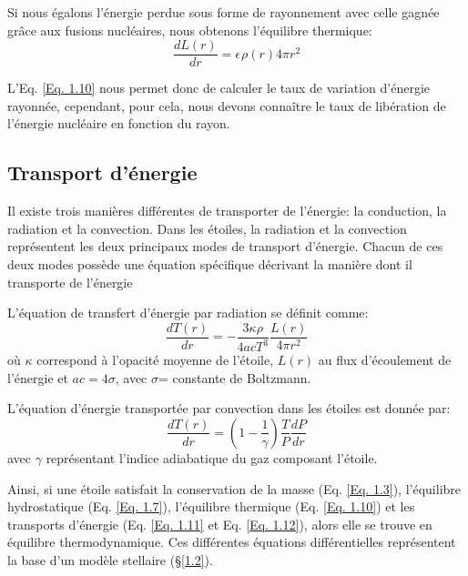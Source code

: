 Si nous égalons l'énergie perdue sous forme de rayonnement avec celle gagnée grâce aux fusions nucléaires, nous obtenons l'équilibre thermique:\begin{equation}\boxed{\dfrac{dL(r)}{dr}=\epsilon\hspace{1pt}\rho(r) 4\pi r^{2}}\label{Eq. 1.10}\end{equation}

L'Eq. \ref{Eq. 1.10} nous permet donc de calculer le taux de variation d'énergie rayonnée, cependant, pour cela, nous devons connaître le taux de libération de l'énergie nucléaire en fonction du rayon. 
\newpage

\subsection{Transport d'énergie}

Il existe trois manières différentes de transporter de l'énergie: la conduction, la radiation et la convection. Dans les étoiles, la radiation et la convection représentent les deux principaux modes de transport d'énergie. Chacun de ces deux modes possède une équation spécifique décrivant la manière dont il transporte de l'énergie\footnotemark[4]\smallskip

L'équation de transfert d'énergie par radiation se définit comme:\begin{equation}\boxed{\dfrac{dT(r)}{dr}=-\dfrac{3\kappa\rho}{4acT^{3}}\dfrac{L(r)}{4\pi r^{2}}}\label{Eq. 1.11}\end{equation} où $\kappa$ correspond à l'opacité moyenne de l'étoile, $L(r)$ au flux d'écoulement de l'énergie et $ac=4\sigma$, avec $\sigma$= constante de Boltzmann.\smallskip

L'équation d'énergie transportée par convection dans les étoiles est donnée par:\begin{equation}\boxed{\dfrac{dT(r)}{dr}= \left(1-\dfrac{1}{\gamma}\right)\dfrac{T}{P}\dfrac{dP}{dr}}\label{Eq. 1.12}\end{equation} avec $\gamma$ représentant l'indice adiabatique du gaz composant l'étoile.\bigskip

Ainsi, si une étoile satisfait la conservation de la masse (Eq. \ref{Eq. 1.3}), l'équilibre hydrostatique (Eq. \ref{Eq. 1.7}), l'équilibre thermique (Eq. \ref{Eq. 1.10}) et les transports d'énergie (Eq. \ref{Eq. 1.11} et Eq. \ref{Eq. 1.12}), alors elle se trouve en équilibre thermodynamique. Ces différentes équations différentielles représentent la base d'un modèle stellaire (§\ref{1.2}).

